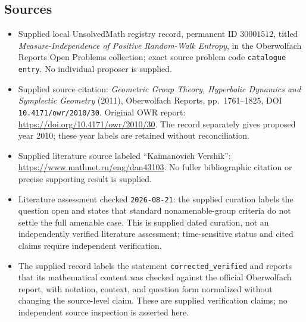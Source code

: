 \documentclass[11pt]{article}
\begin{document}
\subsection{Sources}
\begin{itemize}
\item Supplied local UnsolvedMath registry record, permanent ID \(30001512\), titled \emph{Measure-Independence of Positive Random-Walk Entropy}, in the Oberwolfach Reports Open Problems collection; exact source problem code \texttt{catalogue entry}. No individual proposer is supplied.
\item Supplied source citation: \emph{Geometric Group Theory, Hyperbolic Dynamics and Symplectic Geometry} (2011), Oberwolfach Reports, pp.\ 1761--1825, DOI \texttt{10.4171/owr/2010/30}. Original OWR report: \url{https://doi.org/10.4171/owr/2010/30}. The record separately gives proposed year 2010; these year labels are retained without reconciliation.
\item Supplied literature source labeled ``Kaimanovich Vershik'': \url{https://www.mathnet.ru/eng/dan43103}. No fuller bibliographic citation or precise supporting result is supplied.
\item Literature assessment checked \texttt{2026-08-21}: the supplied curation labels the question open and states that standard nonamenable-group criteria do not settle the full amenable case. This is supplied dated curation, not an independently verified literature assessment; time-sensitive status and cited claims require independent verification.
\item The supplied record labels the statement \texttt{corrected\_verified} and reports that its mathematical content was checked against the official Oberwolfach report, with notation, context, and question form normalized without changing the source-level claim. These are supplied verification claims; no independent source inspection is asserted here.
\end{itemize}
\end{document}
